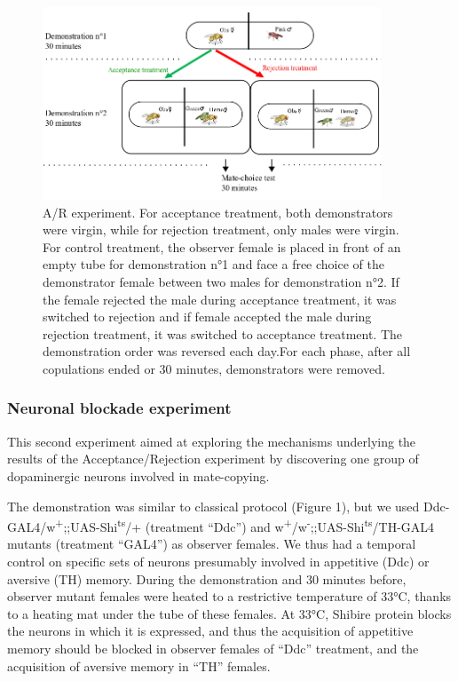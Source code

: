 \documentclass[a4paper, 12pt]{article}
\begin{document}
		\begin{figure}[h]
		\centering
		\includegraphics[width=0.9\textwidth]{images/ar}
		\caption{A/R experiment. 
		For acceptance treatment, both demonstrators were virgin, while for rejection treatment, only males were virgin. For control treatment, the observer female is placed in front of an empty tube for demonstration n°1 and face a free choice of the demonstrator female between two males for demonstration n°2. If the female rejected the male during acceptance treatment, it was switched to rejection and if female accepted the male during rejection treatment, it was switched to acceptance treatment. The demonstration order was reversed each day.For each phase, after all copulations ended or 30 minutes, demonstrators were removed.}
		\label{fig:ar}
	\end{figure}
	
	\subsubsection{Neuronal blockade experiment}
	
	This second experiment aimed at exploring the mechanisms underlying the results of the Acceptance/Rejection experiment by discovering one group of dopaminergic neurons involved in mate-copying.
	
	The demonstration was similar to classical protocol (Figure 1), but we used Ddc-GAL4/w\textsuperscript{+};;UAS-Shi\textsuperscript{ts}/+ (treatment “Ddc”) and w\textsuperscript{+}/w\textsuperscript{-};;UAS-Shi\textsuperscript{ts}/TH-GAL4 mutants (treatment “GAL4”) as observer females. We thus had a temporal control on specific sets of neurons presumably involved in appetitive (Ddc) or aversive (TH) memory. During the demonstration and 30 minutes before, observer mutant females were heated to a restrictive temperature of 33°C, thanks to a heating mat under the tube of these females. At 33°C, Shibire protein blocks the neurons in which it is expressed, and thus the acquisition of appetitive memory should be blocked in observer females of “Ddc” treatment, and the acquisition of aversive memory in “TH” females. 
	
\end{document}
